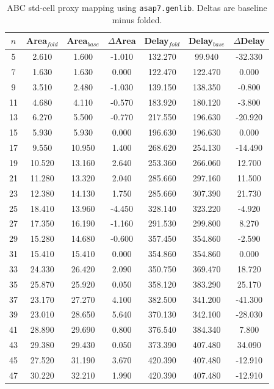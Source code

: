 \begin{table}[t]
\centering
\caption{ABC std-cell proxy mapping using \texttt{asap7.genlib}. Deltas are baseline minus folded.}
\label{tab:stdcell_asap7_genlib}
\begin{tabular}{ccccccc}
\hline
$n$ & Area$_{fold}$ & Area$_{base}$ & $\Delta$Area & Delay$_{fold}$ & Delay$_{base}$ & $\Delta$Delay \\
\hline
5 & 2.610 & 1.600 & -1.010 & 132.270 & 99.940 & -32.330 \\
7 & 1.630 & 1.630 & 0.000 & 122.470 & 122.470 & 0.000 \\
9 & 3.510 & 2.480 & -1.030 & 139.150 & 138.350 & -0.800 \\
11 & 4.680 & 4.110 & -0.570 & 183.920 & 180.120 & -3.800 \\
13 & 6.270 & 5.500 & -0.770 & 217.550 & 196.630 & -20.920 \\
15 & 5.930 & 5.930 & 0.000 & 196.630 & 196.630 & 0.000 \\
17 & 9.550 & 10.950 & 1.400 & 268.620 & 254.130 & -14.490 \\
19 & 10.520 & 13.160 & 2.640 & 253.360 & 266.060 & 12.700 \\
21 & 11.280 & 13.320 & 2.040 & 285.660 & 297.160 & 11.500 \\
23 & 12.380 & 14.130 & 1.750 & 285.660 & 307.390 & 21.730 \\
25 & 18.410 & 13.960 & -4.450 & 328.140 & 323.220 & -4.920 \\
27 & 17.350 & 16.190 & -1.160 & 291.530 & 299.800 & 8.270 \\
29 & 15.280 & 14.680 & -0.600 & 357.450 & 354.860 & -2.590 \\
31 & 15.410 & 15.410 & 0.000 & 354.860 & 354.860 & 0.000 \\
33 & 24.330 & 26.420 & 2.090 & 350.750 & 369.470 & 18.720 \\
35 & 25.870 & 25.920 & 0.050 & 358.120 & 383.290 & 25.170 \\
37 & 23.170 & 27.270 & 4.100 & 382.500 & 341.200 & -41.300 \\
39 & 23.010 & 28.650 & 5.640 & 370.130 & 342.100 & -28.030 \\
41 & 28.890 & 29.690 & 0.800 & 376.540 & 384.340 & 7.800 \\
43 & 29.380 & 29.430 & 0.050 & 373.390 & 407.480 & 34.090 \\
45 & 27.520 & 31.190 & 3.670 & 420.390 & 407.480 & -12.910 \\
47 & 30.220 & 32.210 & 1.990 & 420.390 & 407.480 & -12.910 \\

\end{tabular}
\end{table}
